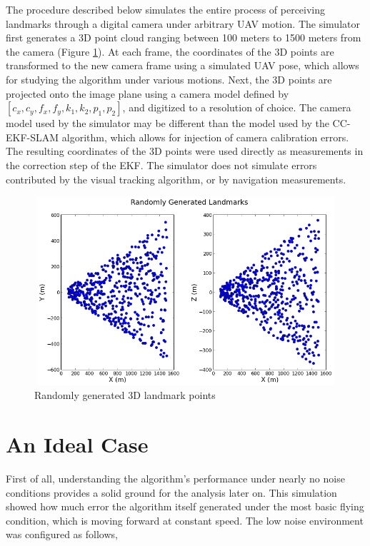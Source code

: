 The procedure described below simulates the entire process
of perceiving landmarks through a digital camera under arbitrary UAV
motion. The simulator first generates a 3D point cloud ranging between
100 meters to 1500 meters from the camera (Figure \ref{fig:simfig51}).
At each frame, the coordinates of the 3D points are transformed to the
new camera frame using a simulated UAV pose, which allows for studying
the algorithm under various motions. Next, the 3D points are projected
onto the image plane using a camera model defined by $[c_{x}, c_{y},
f_{x}, f_{y}, k_{1}, k_{2}, p_{1}, p_{2}]$, and digitized to a
resolution of choice. The camera model used by the simulator may be
different than the model used by the CC-EKF-SLAM algorithm, which
allows for injection of camera calibration errors. The resulting
coordinates of the 3D points were used directly as measurements in the
correction step of the EKF. The simulator does not simulate errors
contributed by the visual tracking algorithm, or by navigation
measurements.

\begin{figure}[h]
\centering
\includegraphics[width=12cm, height=7cm]{./Figures/SimulationFigures/Figure51.png}
\caption{Randomly generated 3D landmark points}
\label{fig:simfig51}
\end{figure}
\FloatBarrier

\section{An Ideal Case}
First of all, understanding the algorithm's performance under nearly
no noise conditions provides a solid ground for the analysis later on.
This simulation showed how much error the algorithm itself generated under
the most basic flying condition, which is moving forward at constant
speed. The low noise environment was configured as follows,

